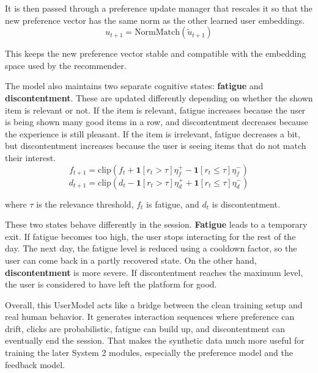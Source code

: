 It is then passed through a preference update manager that rescales it so that the new preference vector has the same norm as the other learned user embeddings.
\begin{equation}
    u_{t+1} = \text{NormMatch}(\tilde{u}_{t+1})
\end{equation}

This keeps the new preference vector stable and compatible with the embedding space used by the recommender. 

The model also maintains two separate cognitive states: \textbf{fatigue} and \textbf{discontentment}. 
These are updated differently depending on whether the shown item is relevant or not. 
If the item is relevant, fatigue increases because the user is being shown many good items in a row,
and discontentment decreases because the experience is still pleasant. 
If the item is irrelevant, fatigue decreases a bit, 
but discontentment increases because the user is seeing items that do not match their interest. 
\begin{equation}
    f_{t+1} = \text{clip}\left(f_t + \mathbf{1}[r_t > \tau]\eta_f^+ - \mathbf{1}[r_t \le \tau]\eta_f^- \right)
\end{equation} 
\begin{equation}
    d_{t+1} = \text{clip}\left(d_t - \mathbf{1}[r_t > \tau]\eta_d^+ + \mathbf{1}[r_t \le \tau]\eta_d^- \right)
\end{equation}

where $\tau$ is the relevance threshold, $f_t$ is fatigue, and $d_t$ is discontentment. 

These two states behave differently in the session. 
\textbf{Fatigue} leads to a temporary exit. 
If fatigue becomes too high, the user stops interacting for the rest of the day. 
The next day, the fatigue level is reduced using a cooldown factor, so the user can come back in a partly recovered state.
On the other hand, \textbf{discontentment} is more severe. 
If discontentment reaches the maximum level, the user is considered to have left the platform for good. 

Overall, this UserModel acts like a bridge between the clean training setup and real human behavior. 
It generates interaction sequences where preference can drift, clicks are probabilistic, 
fatigue can build up, and discontentment can eventually end the session.
That makes the synthetic data much more useful for training the later System 2 modules,
especially the preference model and the feedback model.


